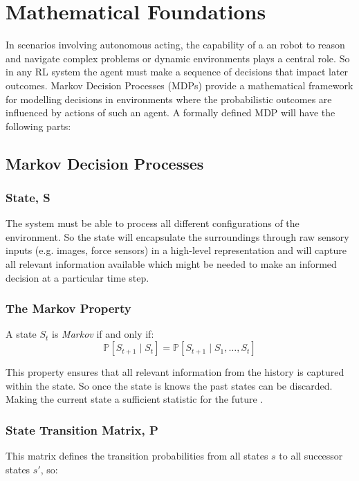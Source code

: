\section{Mathematical Foundations}

  In scenarios involving autonomous acting, the capability of a an robot to reason and navigate complex problems or dynamic environments plays a central role. So in any RL system the agent must make a sequence of decisions that impact later outcomes. Markov Decision Processes (MDPs) provide a mathematical framework for modelling decisions in environments where the probabilistic outcomes are influenced by actions of such an agent. A formally defined MDP will have the following parts:

\subsection{Markov Decision Processes}
  \label{subsec:mdp}
  \subsubsection{State, S}
    The system must be able to process all different configurations of the environment. So the state will encapsulate the surroundings through raw sensory inputs (e.g. images, force sensors) in a high-level representation and will capture all relevant information available \cite{Sutton1998} which might be needed to make an informed decision at a particular time step.

  \subsubsection{The Markov Property}
    A state $S_t$ is \emph{Markov} if and only if:
    \[
      \mathbb{P} \left[S_{t+1} \mid S_t\right] = \mathbb{P}\left[ S_{t+1} \mid S_1, \ldots, S_t\right]
    \]

    This property ensures that all relevant information from the history is captured within the state. So once the state is knows the past states can be discarded. Making the current state a sufficient statistic for the future \cite{silver2015}.

  \subsubsection{State Transition Matrix, P}
    This matrix defines the transition probabilities from all states $s$ to all successor states $s'$, so:
    
